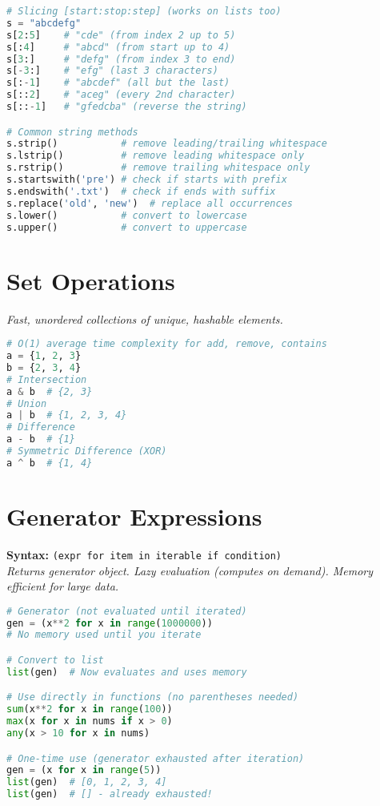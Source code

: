 \documentclass[8pt,landscape]{article}
\begin{document}
\begin{multicols}{3}
\begin{lstlisting}[language=Python]
# Slicing [start:stop:step] (works on lists too)
s = "abcdefg"
s[2:5]    # "cde" (from index 2 up to 5)
s[:4]     # "abcd" (from start up to 4)
s[3:]     # "defg" (from index 3 to end)
s[-3:]    # "efg" (last 3 characters)
s[:-1]    # "abcdef" (all but the last)
s[::2]    # "aceg" (every 2nd character)
s[::-1]   # "gfedcba" (reverse the string)

# Common string methods
s.strip()           # remove leading/trailing whitespace
s.lstrip()          # remove leading whitespace only
s.rstrip()          # remove trailing whitespace only
s.startswith('pre') # check if starts with prefix
s.endswith('.txt')  # check if ends with suffix
s.replace('old', 'new')  # replace all occurrences
s.lower()           # convert to lowercase
s.upper()           # convert to uppercase
\end{lstlisting}

\section*{Set Operations}
\textit{Fast, unordered collections of unique, hashable elements.}
\begin{lstlisting}[language=Python]
# O(1) average time complexity for add, remove, contains
a = {1, 2, 3}
b = {2, 3, 4}
# Intersection
a & b  # {2, 3}
# Union
a | b  # {1, 2, 3, 4}
# Difference
a - b  # {1}
# Symmetric Difference (XOR)
a ^ b  # {1, 4}
\end{lstlisting}

\section*{Generator Expressions}
\textbf{Syntax:} \lstinline|(expr for item in iterable if condition)| \\
\textit{Returns generator object. Lazy evaluation (computes on demand). Memory efficient for large data.}

\begin{lstlisting}[language=Python]
# Generator (not evaluated until iterated)
gen = (x**2 for x in range(1000000))
# No memory used until you iterate

# Convert to list
list(gen)  # Now evaluates and uses memory

# Use directly in functions (no parentheses needed)
sum(x**2 for x in range(100))
max(x for x in nums if x > 0)
any(x > 10 for x in nums)

# One-time use (generator exhausted after iteration)
gen = (x for x in range(5))
list(gen)  # [0, 1, 2, 3, 4]
list(gen)  # [] - already exhausted!
\end{lstlisting}


\end{multicols}
\end{document}
